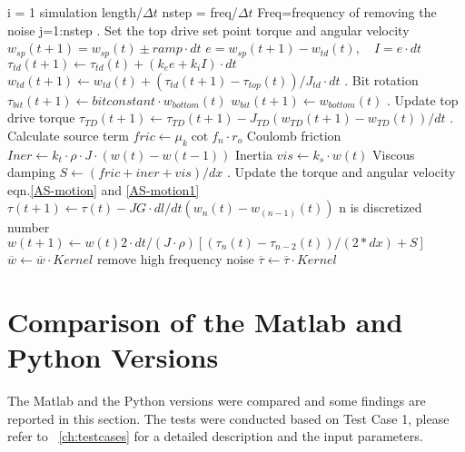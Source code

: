 \newcommand{\codecomment}[1]{\hfill #1}
\pushinitialcodeindent{0in}
\begin{code}[\codenumbering]{}
\codeitemnonumber \pseudocodefor{} i = 1 simulation length/$\Delta t$
	\stepcodelevel{}
	\codeitemnonumber nstep = freq/$\Delta t$ \codecomment{Freq=frequency of removing the noise}
	\codeitemnonumber \pseudocodefor{} {j=1:nstep}
		\stepcodelevel{}
	    . Set the top drive set point torque and angular velocity
	    \codeitemnonumber $w_{sp}(t+1)=w_{sp}(t)\pm ramp \cdot dt$
	    \codeitemnonumber $e=w_{sp}(t+1)-w_{td}(t), \quad I=e \cdot dt$
	    \codeitemnonumber $\tau_{td}(t+1) \gets \tau_{td}(t) + (k_e e + k_i I) \cdot dt$
	    \codeitemnonumber $w_{td}(t+1) \gets w_{td}(t) + (\tau_{td}(t+1)-\tau_{top}(t))/J_{td} \cdot dt$
	    . Bit rotation
	    \codeitemnonumber $\tau_{bit}(t+1) \gets bitconstant \cdot w_{bottom}(t)$
	    \codeitemnonumber $w_{bit}(t+1) \gets w_{bottom}(t)$
	    . Update top drive torque
	    \codeitemnonumber $\tau_{TD}(t+1) \gets \tau_{TD}(t+1)-J_{TD}(w_{TD}(t+1)-w_{TD}(t))/dt$
	    . Calculate source term
	    \codeitemnonumber $fric \gets \mu_k \cot f_n \cdot r_o$ \codecomment{Coulomb friction}
	    \codeitemnonumber $Iner \gets k_t \cdot \rho \cdot J \cdot (w(t)-w(t-1))$ \codecomment{Inertia}
	    \codeitemnonumber $vis \gets k_s \cdot w(t)$ \codecomment{Viscous damping}
	    \codeitemnonumber $S \gets (fric+iner+vis)/dx$
	    . Update the torque and angular velocity \codecomment{eqn.\ref{AS-motion} and \ref{AS-motion1}}
	    \codeitemnonumber $\tau(t+1) \gets \tau(t) - JG \cdot dl/dt (w_n(t)-w_{(n-1)}(t))$ \codecomment{n is discretized number}
	    \codeitemnonumber $w(t+1) \gets w(t) 2 \cdot dt/(J \cdot \rho)\left[(\tau_n(t)-\tau_{n-2}(t))/(2*dx)+S\right]$
	    \prevcodelevel{}
	\codeitemnonumber \pseudocodedonefor{}
	\codeitemnonumber $\overline{w} \gets \overline{w} \cdot Kernel$ \codecomment{remove high frequency noise}
	\codeitemnonumber $\overline{\tau} \gets \overline{\tau} \cdot Kernel$
	\prevcodelevel{}
\codeitemnonumber \pseudocodedonefor{}
\end{code}
\popinitialcodeindent{}

\section{Comparison of the Matlab and Python Versions}
The Matlab and the Python versions were compared and some findings are reported in this section.  The tests were conducted based on Test Case 1, please refer to \chaptername~\ref{ch:testcases} for a detailed description and the input parameters.

